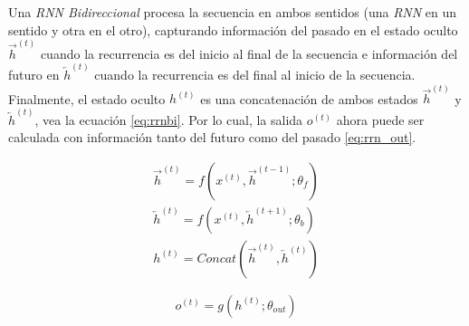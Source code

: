 Una \textit{RNN Bidireccional} procesa la secuencia en ambos sentidos (una \textit{RNN} en un
sentido y otra en el otro), capturando información del
pasado en el estado oculto $\overrightarrow{h}^{(t)}$  cuando la recurrencia es del inicio al final
de la secuencia e información del futuro en $\overleftarrow{h}  ^{(t)}$ cuando la recurrencia es del
final al inicio de la secuencia. Finalmente, el estado oculto $h^{(t)}$ es una concatenación de ambos
estados $\overrightarrow{h}^{(t)}$ y $\overleftarrow{h}^{(t)}$, vea la ecuación \ref{eq:rrnbi}.
Por lo cual, la salida $o^{(t)}$ ahora puede ser calculada con información tanto del futuro como del pasado
\ref{eq:rrn_out}.

\begin{equation}
\begin{split}
    \overrightarrow{h}^{(t)} = f(x^{(t)}, \overrightarrow{h}^{(t-1)}; \theta_f)\\
    \overleftarrow{h}^{(t)} = f(x^{(t)}, \overleftarrow{h}^{(t+1)}; \theta_b)\\
    h^{(t)} = Concat(\overrightarrow{h}^{(t)}, \overleftarrow{h}^{(t)})
\end{split}
\label{eq:rrnbi}
\end{equation}

\begin{equation}
        o^{(t)} = g(h^{(t)}; \theta_{out})
\label{eq:rrn_out}
\end{equation}
